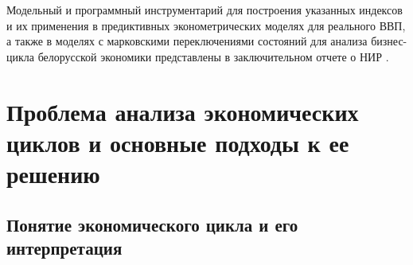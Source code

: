 \documentclass[a4paper,14pt]{extreport}
\begin{document}
	Модельный и программный инструментарий для построения указанных  индексов и их применения в предиктивных эконометрических моделях для реального ВВП, а также в моделях с марковскими переключениями состояний для анализа бизнес-цикла белорусской экономики представлены в заключительном отчете о НИР \cite{esiMaking}.
	
	
	
	\chapter{Проблема анализа экономических циклов и основные подходы к ее решению}
	
	\section{Понятие экономического цикла и его интерпретация}
	
	\iffalse
	
	Экономический цикл (бизнес–цикл), согласно определению У–К. Митчелла \cite{mitchellBS}, можно интерпретировать как тип колебаний в общей деловой активности, которая состоит из экспансий, происходящих примерно одновременно в различных видах деятельности, следующих за ними и сопоставимыми по распространенности замедлениями, спадами, оживлениями; ... [без] четкой периодичности; ... [могут] длиться от одного года до десяти или двенадцати лет; бизнес–циклы не могут быть подразделены на более короткие циклы со схожими характеристиками и амплитудой.>>  В данной работе рассматриваются преимущественно краткосрочные циклы, с периодом в порядке 2–3 года (циклы Китчена).
	
	NBER США разбивает циклы на фазы сокращения и экспансии. Рассматривается повышение/понижение активности относительно <<нормального>> уровня. Общая экономическая активность сама характеризуется не только отдельной цифрой ВВП, но и доходами, занятостью, уровнем активности отдельных отраслей \cite{nberDevelopment}. Из–за стабилизации долгосрочных темпов роста экономик к концу ХХ в. изменилась методолония – начали рассматриваться темпы роста экономики (ускорение или замедление относительно долговременного тренда), а также подразделение цикла на 4 части: экспансия (рост над долгосрочным трендом), замедление (падение над трендом), сжатие (снижение под трендом), и восстановление (рост под трендом) \cite{oecdCLI}.
	\fi
	
	\iffalse
	Unused material
	
	Предполагается, что поворотные точки опережающих индикаторов предшествуют поворотным точкам некоторого базового экономического индикатора (например, реального ВВП), характеризующего состояние экономики в целом. В настоящее время существуют два основных методологических центра по разработке подобных индикаторов:   Национальное бюро экономических исследований (НБЭИ) США  (National Bureau of Economic Research – NBER) и Статистический  департамент Организации экономического сотрудничества и развития (ОЭСР) (Organization for Economic Cooperation and Development – OECD). 
	\fi
	
\end{document}
